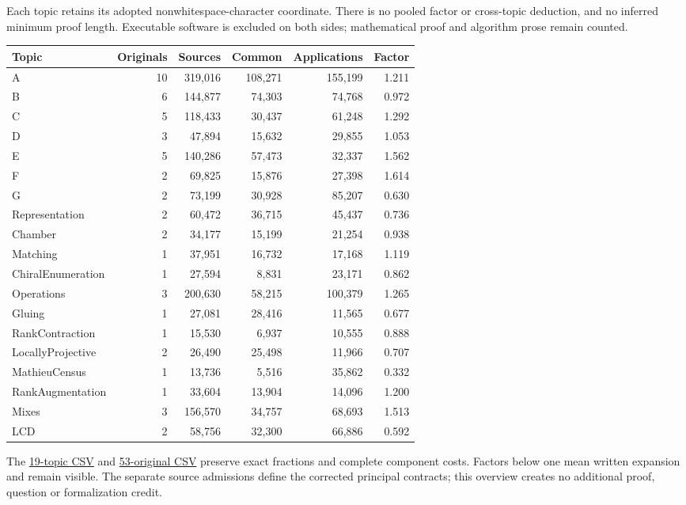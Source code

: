 \documentclass[11pt,a4paper]{article}
\begin{document}
Each topic retains its adopted nonwhitespace-character coordinate. There is no pooled factor or cross-topic deduction, and no inferred minimum proof length. Executable software is excluded on both sides; mathematical proof and algorithm prose remain counted.
\begin{center}\small\begin{tabular}{lrrrrr}\toprule
Topic & Originals & Sources & Common & Applications & Factor\\\midrule
A & 10 & 319,016 & 108,271 & 155,199 & 1.211 \\
B & 6 & 144,877 & 74,303 & 74,768 & 0.972 \\
C & 5 & 118,433 & 30,437 & 61,248 & 1.292 \\
D & 3 & 47,894 & 15,632 & 29,855 & 1.053 \\
E & 5 & 140,286 & 57,473 & 32,337 & 1.562 \\
F & 2 & 69,825 & 15,876 & 27,398 & 1.614 \\
G & 2 & 73,199 & 30,928 & 85,207 & 0.630 \\
Representation & 2 & 60,472 & 36,715 & 45,437 & 0.736 \\
Chamber & 2 & 34,177 & 15,199 & 21,254 & 0.938 \\
Matching & 1 & 37,951 & 16,732 & 17,168 & 1.119 \\
ChiralEnumeration & 1 & 27,594 & 8,831 & 23,171 & 0.862 \\
Operations & 3 & 200,630 & 58,215 & 100,379 & 1.265 \\
Gluing & 1 & 27,081 & 28,416 & 11,565 & 0.677 \\
RankContraction & 1 & 15,530 & 6,937 & 10,555 & 0.888 \\
LocallyProjective & 2 & 26,490 & 25,498 & 11,966 & 0.707 \\
MathieuCensus & 1 & 13,736 & 5,516 & 35,862 & 0.332 \\
RankAugmentation & 1 & 33,604 & 13,904 & 14,096 & 1.200 \\
Mixes & 3 & 156,570 & 34,757 & 68,693 & 1.513 \\
LCD & 2 & 58,756 & 32,300 & 66,886 & 0.592 \\
\bottomrule\end{tabular}\end{center}
The \href{topics.csv}{19-topic CSV} and \href{applications.csv}{53-original CSV} preserve exact fractions and complete component costs. Factors below one mean written expansion and remain visible. The separate source admissions define the corrected principal contracts; this overview creates no additional proof, question or formalization credit.
\newpage
\end{document}
